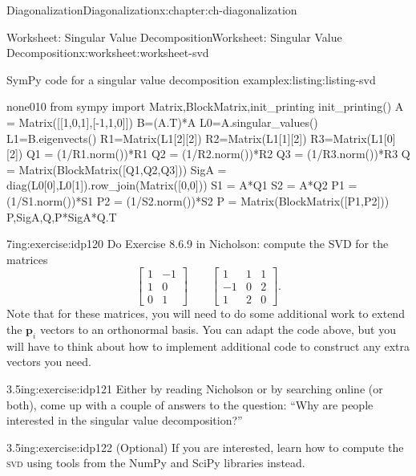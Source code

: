 \documentclass[oneside,10pt,]{book}
\newcommand{\initialism}[1]{\textsc{\MakeLowercase{#1}}}
\numberwithin{equation}{section}
\newcommand{\bbm}{\begin{bmatrix}}
\newcommand{\ebm}{\end{bmatrix}}
\newcommand{\vecp}{\mathbf{p}}
\newcommand{\amp}{&}
\begin{document}
\begin{chapterptx}{Diagonalization}{}{Diagonalization}{}{}{x:chapter:ch-diagonalization}
\begin{worksheet-section}{Worksheet: Singular Value Decomposition}{}{Worksheet: Singular Value Decomposition}{}{}{x:worksheet:worksheet-svd}
\begin{listingptx}{SymPy code for a singular value decomposition example}{x:listing:listing-svd}{}%
\begin{program}{none}{0}{1}{0}
from sympy import Matrix,BlockMatrix,init_printing
init_printing()
A = Matrix([[1,0,1],[-1,1,0]])
B=(A.T)*A
L0=A.singular_values()
L1=B.eigenvects()
R1=Matrix(L1[2][2])
R2=Matrix(L1[1][2])
R3=Matrix(L1[0][2])
Q1 = (1/R1.norm())*R1
Q2 = (1/R2.norm())*R2
Q3 = (1/R3.norm())*R3
Q = Matrix(BlockMatrix([Q1,Q2,Q3]))
SigA = diag(L0[0],L0[1]).row_join(Matrix([0,0]))
S1 = A*Q1
S2 = A*Q2
P1 = (1/S1.norm())*S1
P2 = (1/S2.norm())*S2
P = Matrix(BlockMatrix([P1,P2]))
P,SigA,Q,P*SigA*Q.T
\end{program}
\tcblower
\end{listingptx}%
\clearpage
\begin{divisionexercise}{1}{}{7in}{g:exercise:idp120}%
Do Exercise 8.6.9 in Nicholson: compute the SVD for the matrices%
\begin{equation*}
\bbm 1\amp -1\\1\amp 0\\0\amp 1\ebm \quad \quad \bbm 1\amp 1\amp 1\\-1\amp 0\amp 2 \\1\amp 2\amp 0\ebm\text{.}
\end{equation*}
Note that for these matrices, you will need to do some additional work to extend the \(\vecp_i\) vectors to an orthonormal basis. You can adapt the code above, but you will have to think about how to implement additional code to construct any extra vectors you need.%
\end{divisionexercise}%
\clearpage
\begin{divisionexercise}{2}{}{3.5in}{g:exercise:idp121}%
Either by reading Nicholson or by searching online (or both), come up with a couple of answers to the question: ``Why are people interested in the singular value decomposition?''%
\end{divisionexercise}%
\begin{divisionexercise}{3}{}{3.5in}{g:exercise:idp122}%
(Optional) If you are interested, learn how to compute the \initialism{SVD} using tools from the NumPy and SciPy libraries instead.%
\end{divisionexercise}%
\end{worksheet-section}
\restoregeometry
\end{chapterptx}
%
%
\typeout{************************************************}
\typeout{************************************************}
\end{document}
